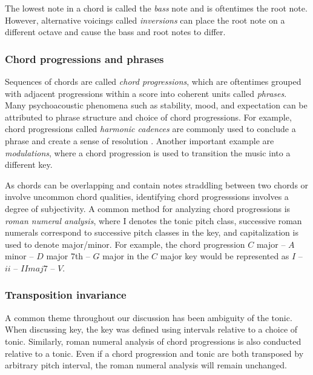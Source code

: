 The lowest note in a chord is called the \emph{bass} note and is oftentimes the
root note. However, alternative voicings called \emph{inversions} can place the
root note on a different octave and cause the bass and root notes to
differ.

\subsubsection{Chord progressions and phrases}

Sequences of chords are called \emph{chord progressions}, which are oftentimes
grouped with adjacent progressions within a score into coherent units called
\emph{phrases}. Many psychoacoustic phenomena such as stability, mood, and
expectation can be attributed to phrase structure and choice of chord
progressions. For example, chord progressions called \emph{harmonic cadences}
are commonly used to conclude a phrase and create a sense of
resolution \citep{randel1999harvard}. Another important example are
\emph{modulations}, where a chord progression is used to transition the music
into a different key.

As chords can be overlapping and contain notes straddling between two chords or
involve uncommon chord qualities, identifying chord progresssions involves a
degree of subjectivity. A common method for analyzing chord progressions is
\emph{roman numeral analysis}, where I denotes the tonic pitch class, successive
roman numerals correspond to successive pitch classes in the key, and
capitalization is used to denote major/minor. For example, the chord
progression $C$ major -- $A$ minor -- $D$ major 7th -- $G$ major in the $C$
major key would be represented as $I$ -- $ii$ -- $IImaj7$ -- $V$.


\subsubsection{Transposition invariance}

A common theme throughout our discussion has been ambiguity of the tonic. When
discussing key, the key was defined using intervals relative to a
choice of tonic. Similarly, roman numeral analysis of chord progressions is
also conducted relative to a tonic. Even if a chord progression and tonic are
both transposed by arbitrary pitch interval, the roman numeral analysis will
remain unchanged.

